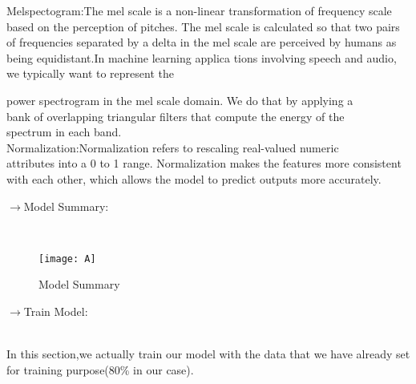\documentclass[a4paper,12pt]{article}
\begin{document}
Melspectogram:The mel scale is a non-linear transformation of frequency  
\hspace*{0.5cm} scale based on the perception of pitches. The mel scale is
  calculated 
  \hspace*{0.5cm} so that two pairs of frequencies separated by a
 delta in the mel scale are 
 \hspace*{0.5cm} perceived by humans as being equidistant.In machine learning applica
 \hspace*{0.5cm} tions involving speech and audio, we typically want to represent the
 
   power spectrogram in the mel scale domain. We do that by applying a\\
   \hspace*{0.5cm} bank of overlapping triangular filters that compute the energy of the\\
    \hspace*{0.5cm} spectrum in each band. \\
    
    Normalization:Normalization refers to rescaling real-valued numeric\\
    \hspace*{0.5cm} attributes into a 0 to 1 range. Normalization makes the features more 
   \hspace*{0.5cm} consistent with each other, which allows the model to predict outputs
   \hspace*{0.5cm} more accurately.\\
   
\pagebreak
   
 \begin{large}
$\rightarrow$Model Summary:
\end{large}\\  

\begin{figure}[h]
\centering
\texttt{[image: A]}
\caption{Model Summary}
\end{figure}



\begin{large}
$\rightarrow$Train Model:
\end{large}\\

In this section,we actually train our model with the data that we have
\hspace*{0.5cm} already  set for training purpose(80\% in our case).\\
\end{document}
